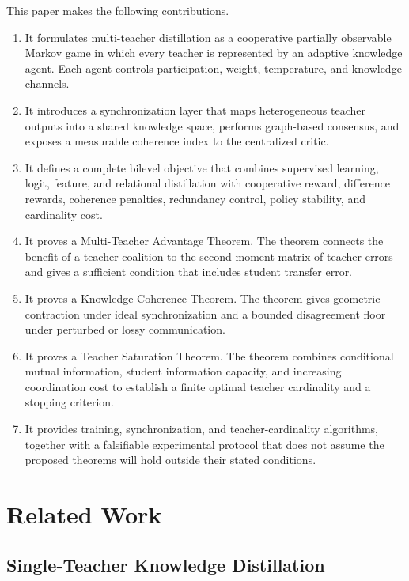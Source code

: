 \documentclass[10pt,twocolumn,a4paper]{article}
\begin{document}
This paper makes the following contributions.

\begin{enumerate}
    \item It formulates multi-teacher distillation as a cooperative partially observable Markov game in which every teacher is represented by an adaptive knowledge agent. Each agent controls participation, weight, temperature, and knowledge channels.
    \item It introduces a synchronization layer that maps heterogeneous teacher outputs into a shared knowledge space, performs graph-based consensus, and exposes a measurable coherence index to the centralized critic.
    \item It defines a complete bilevel objective that combines supervised learning, logit, feature, and relational distillation with cooperative reward, difference rewards, coherence penalties, redundancy control, policy stability, and cardinality cost.
    \item It proves a Multi-Teacher Advantage Theorem. The theorem connects the benefit of a teacher coalition to the second-moment matrix of teacher errors and gives a sufficient condition that includes student transfer error.
    \item It proves a Knowledge Coherence Theorem. The theorem gives geometric contraction under ideal synchronization and a bounded disagreement floor under perturbed or lossy communication.
    \item It proves a Teacher Saturation Theorem. The theorem combines conditional mutual information, student information capacity, and increasing coordination cost to establish a finite optimal teacher cardinality and a stopping criterion.
    \item It provides training, synchronization, and teacher-cardinality algorithms, together with a falsifiable experimental protocol that does not assume the proposed theorems will hold outside their stated conditions.
\end{enumerate}

\section{Related Work}
\label{sec:related}

\subsection{Single-Teacher Knowledge Distillation}
\end{document}

